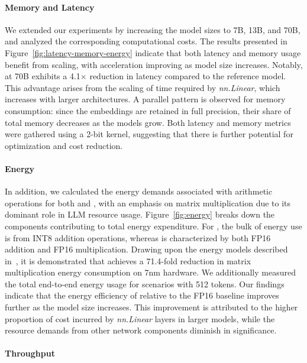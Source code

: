 \paragraph{Memory and Latency}

We extended our experiments by increasing the model sizes to 7B, 13B, and 70B, and analyzed the corresponding computational costs. The results presented in Figure~\ref{fig:latency-memory-energy} indicate that both latency and memory usage benefit from scaling, with acceleration improving as model size increases. Notably,  at 70B exhibits a 4.1$\times$ reduction in latency compared to the  reference model. This advantage arises from the scaling of time required by \emph{nn.Linear}, which increases with larger architectures. A parallel pattern is observed for memory consumption: since the embeddings are retained in full precision, their share of total memory decreases as the models grow. Both latency and memory metrics were gathered using a 2-bit kernel, suggesting that there is further potential for optimization and cost reduction.

\paragraph{Energy}

In addition, we calculated the energy demands associated with arithmetic operations for both  and , with an emphasis on matrix multiplication due to its dominant role in LLM resource usage. Figure~\ref{fig:energy} breaks down the components contributing to total energy expenditure. For , the bulk of energy use is from INT8 addition operations, whereas  is characterized by both FP16 addition and FP16 multiplication. Drawing upon the energy models described in~\cite{energycost, pokebnn}, it is demonstrated that  achieves a 71.4-fold reduction in matrix multiplication energy consumption on 7nm hardware. We additionally measured the total end-to-end energy usage for scenarios with 512 tokens. Our findings indicate that the energy efficiency of  relative to the FP16  baseline improves further as the model size increases. This improvement is attributed to the higher proportion of cost incurred by \emph{nn.Linear} layers in larger models, while the resource demands from other network components diminish in significance.

\paragraph{Throughput}

